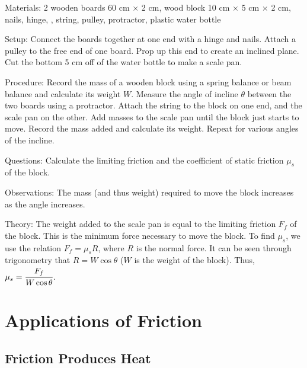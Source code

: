 \begin{multicols}{2}
\begin{description*}
\item[Materials:]{2 wooden boards 60 cm $\times$ 2 cm, wood block 10 cm $\times$ 5 cm $\times$ 2 cm, nails, hinge, , string, pulley, protractor, plastic water bottle}
\item[Setup:]{Connect the boards together at one end with a hinge and nails. Attach a pulley to the free end of one board. Prop up this end to create an inclined plane. Cut the bottom 5 cm off of the water bottle to make a scale pan.}
\item[Procedure:]{Record the mass of a wooden block using a spring balance or beam balance and calculate its weight $W$. Measure the angle of incline $\theta$ between the two boards using a protractor. Attach the string to the block on one end, and the scale pan on the other. Add masses to the scale pan until the block just starts to move. Record the mass added and calculate its weight. Repeat for various angles of the incline.}
\item[Questions:]{Calculate the limiting friction and the coefficient of static friction $\mu_s$ of the block.}
\item[Observations:]{The mass (and thus weight) required to move the block increases as the angle increases.}
\item[Theory:]{The weight added to the scale pan is equal to the limiting friction $F_f$ of the block. This is the minimum force necessary to move the block. To find $\mu_s$, we use the relation $F_f=\mu_s R$, where $R$ is the normal force. It can be seen through trigonometry that $R=W\cos{\theta}$ ($W$ is the weight of the block). Thus, $\mu_s=\cfrac{F_f}{W\cos{\theta}}$.}
\end{description*}

\vfill
\columnbreak


\section*{Applications of Friction}


\subsection{Friction Produces Heat}


\end{multicols}
